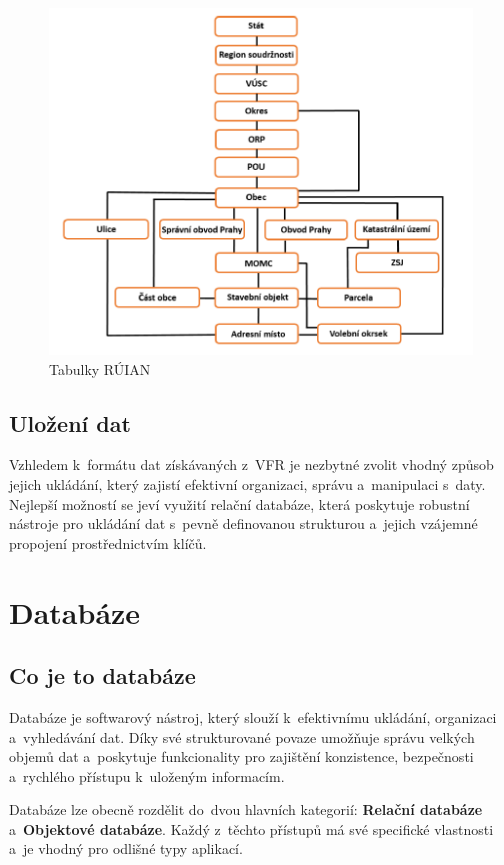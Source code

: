 \documentclass[czech, kiv, ba, he, iso690numb, pdf]{fasthesis}
\begin{document}
\begin{figure}[ht]
    \centering
    \includegraphics[width=\textwidth]{figures/ruian_tables.png}
    \caption{Tabulky RÚIAN}
    \label{fig:ruian_tables}
\end{figure}


\section{Uložení dat}
Vzhledem k~formátu dat získávaných z~VFR je nezbytné zvolit 
vhodný způsob jejich ukládání, který zajistí efektivní organizaci, správu a~manipulaci s~daty. 
Nejlepší možností se jeví využití relační databáze, která poskytuje robustní nástroje pro 
ukládání dat s~pevně definovanou strukturou a~jejich vzájemné propojení prostřednictvím klíčů.

\chapter{Databáze}
\section{Co je to databáze}
Databáze je softwarový nástroj, který slouží k~efektivnímu ukládání, organizaci a~vyhledávání dat. 
Díky své strukturované povaze umožňuje správu velkých objemů dat a~poskytuje funkcionality pro 
zajištění konzistence, bezpečnosti a~rychlého přístupu k~uloženým informacím.

Databáze lze obecně rozdělit do~dvou hlavních kategorií: \textbf{Relační databáze} a~\textbf{Objektové databáze}. 
Každý z~těchto přístupů má své specifické vlastnosti a~je vhodný pro odlišné typy aplikací.
\end{document}
